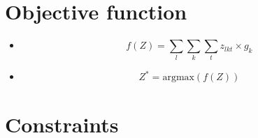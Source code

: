 \documentclass{article}
\begin{document}
\section{Objective function}
\begin{itemize}[label={}]
    \item \begin{equation}
        f(Z) = \sum_l \sum_k \sum_t z_{lkt} \times g_{k}
    \end{equation}
    \item \begin{equation}
        Z^\ast = \text{argmax}(f(Z))
    \end{equation}
\end{itemize}

\section{Constraints}
\end{document}
